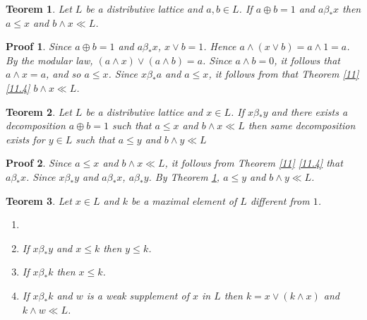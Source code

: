 \documentclass[a4paper,12pt]{article}
\numberwithin{equation}{section}
\theoremstyle{italik}
\newtheorem{teorem}{Teorem}[section]
\newtheorem*{ispat}{Proof}
\begin{document}
\begin{teorem}\label{12}
  Let $ L $ be a distributive lattice and $ a,b \in L $. If $ a \oplus b = 1 $ and $ a \beta_* x $ 
  then $ a \leq x $ and $ b \wedge x \ll L $.
\end{teorem}
\begin{ispat}
    Since $ a \oplus b = 1 $ and $ a \beta_* x $, $ x \vee b = 1 $. Hence $ a \wedge ( x \vee b ) = a \wedge 1 = a $. 
    By the modular law, $ ( a \wedge x ) \vee ( a \wedge b ) = a $. Since $ a \wedge b = 0 $, 
    it follows that $ a \wedge x = a $, and so $ a \leq x $. Since $ x \beta_* a $ and $ a \leq x $, 
    it follows from that Theorem \ref{11} \ref{11.4} $ b \wedge x \ll L $.
\end{ispat}


\begin{teorem}\label{13}
    Let $ L $ be a distributive lattice and $ x \in L $. If $ x \beta_* y $ and there exists a 
    decomposition $ a \oplus b = 1 $ such that $ a \leq x $ and $ b \wedge x \ll L $ then same 
    decomposition exists for $ y \in L $ such that $ a \leq y $ and $ b \wedge y \ll L $
\end{teorem}
\begin{ispat}
    Since $ a \leq x $ and $ b \wedge x \ll L $, it follows from Theorem \ref{11} \ref{11.4} 
    that $ a \beta_* x $. Since $ x \beta_* y $ and $ a \beta_* x $, $ a \beta_* y $. 
    By Theorem \ref{12}, $ a \leq y $ and $ b \wedge y \ll L $.
\end{ispat}

%
%
%
%
%
%

\begin{teorem}\label{14}
    Let $ x \in L $ and $ k $ be a maximal element of $ L $ different from $ 1 $.
    \begin{enumerate}[label=(\roman{*}), ref=(\roman{*})]
        \item 
            \label{14.1}
        \item
            If $ x \beta_*y $ and $ x \leq k $ then $ y \leq k $. \label{14.2}
        \item
            If $ x \beta_* k $ then $ x \leq k $. \label{14.3}
        \item
            If $ x \beta_* k $ and $ w $ is a weak supplement of $ x $ in $ L $ then $ k = x \vee ( k \wedge x ) $ 
            and  $ k \wedge w \ll L $. \label{14.4}
    \end{enumerate}
\end{teorem}
\end{document}
